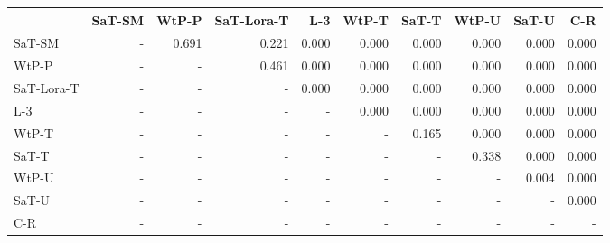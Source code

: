 \begin{tabular}{lrrrrrrrrr}
\toprule
 & SaT-SM & WtP-P & SaT-Lora-T & L-3 & WtP-T & SaT-T & WtP-U & SaT-U & C-R \\
\midrule
SaT-SM & - & 0.691 & 0.221 & 0.000 & 0.000 & 0.000 & 0.000 & 0.000 & 0.000 \\
WtP-P & - & - & 0.461 & 0.000 & 0.000 & 0.000 & 0.000 & 0.000 & 0.000 \\
SaT-Lora-T & - & - & - & 0.000 & 0.000 & 0.000 & 0.000 & 0.000 & 0.000 \\
L-3 & - & - & - & - & 0.000 & 0.000 & 0.000 & 0.000 & 0.000 \\
WtP-T & - & - & - & - & - & 0.165 & 0.000 & 0.000 & 0.000 \\
SaT-T & - & - & - & - & - & - & 0.338 & 0.000 & 0.000 \\
WtP-U & - & - & - & - & - & - & - & 0.004 & 0.000 \\
SaT-U & - & - & - & - & - & - & - & - & 0.000 \\
C-R & - & - & - & - & - & - & - & - & - \\
\bottomrule
\end{tabular}

